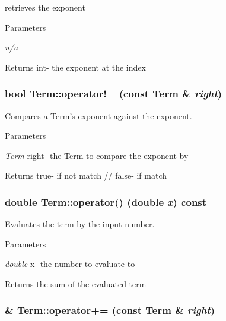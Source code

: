 retrieves the exponent 
\begin{DoxyParams}{Parameters}
\item[{\em n/a}]\end{DoxyParams}
\begin{DoxyReturn}{Returns}
int-\/ the exponent at the index 
\end{DoxyReturn}
\hypertarget{classTerm_afa3f759f8bf094001d4b979999e40696}{
\subsubsection[{operator!=}]{\setlength{\rightskip}{0pt plus 5cm}bool Term::operator!= (const {\bf Term} \& {\em right})}}
\label{classTerm_afa3f759f8bf094001d4b979999e40696}


Compares a Term's exponent against the exponent. 
\begin{DoxyParams}{Parameters}
\item[{\em \hyperlink{classTerm}{Term}}]right-\/ the \hyperlink{classTerm}{Term} to compare the exponent by \end{DoxyParams}
\begin{DoxyReturn}{Returns}
true-\/ if not match // false-\/ if match 
\end{DoxyReturn}
\hypertarget{classTerm_ab89ea23f82711d4fc9f4608d0937ce31}{
\subsubsection[{operator()}]{\setlength{\rightskip}{0pt plus 5cm}double Term::operator() (double {\em x}) const}}
\label{classTerm_ab89ea23f82711d4fc9f4608d0937ce31}


Evaluates the term by the input number. 
\begin{DoxyParams}{Parameters}
\item[{\em double}]x-\/ the number to evaluate to \end{DoxyParams}
\begin{DoxyReturn}{Returns}
the sum of the evaluated term 
\end{DoxyReturn}
\hypertarget{classTerm_a596ebc6a2a6a32b2fc7396ed2cc1ed99}{
\subsubsection[{operator+=}]{ \& Term::operator+= (const {\bf Term} \& {\em right})}}
\label{classTerm_a596ebc6a2a6a32b2fc7396ed2cc1ed99}


